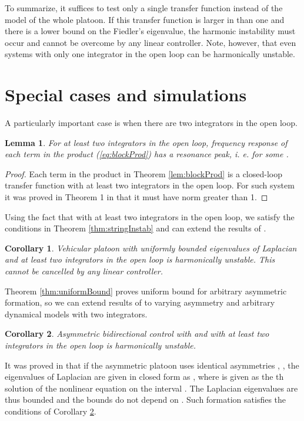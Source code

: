 \documentclass[technote, 10pt, twoside]{IEEEtran}
\theoremstyle{plain}
\newtheorem{lemma}{Lemma}
\newtheorem{corollary}{Corollary}
\theoremstyle{definition}
\theoremstyle{assump}
\begin{document}
To summarize, it suffices to test only a single transfer function
 instead of the model of the whole platoon. If this
transfer function is larger in  than one and there is a
lower bound on the Fiedler's eigenvalue, the harmonic instability must occur and
cannot be overcome by any linear controller. Note, however, that even systems
with only one integrator in the open loop can be harmonically unstable.
\section{Special cases and simulations}
A particularly important case is when there are two integrators in the open
loop.
\begin{lemma}
	For at least two integrators in the open loop, frequency response of each term 	in the product (\ref{eq:blockProd}) has a resonance peak, i. e.  for some .
	\label{lem:overshoot}
\end{lemma}
\begin{proof}
	Each term in the product in Theorem \ref{lem:blockProd} is a closed-loop
	transfer function with at least two integrators in the open loop. For such system it was proved in Theorem 1 in \cite{Seiler2004a} that it must have  norm greater than 1. 
\end{proof} 
Using the fact that  with at least two
integrators in the open loop, we satisfy the
conditions in Theorem \ref{thm:stringInstab} and can extend the results of
\cite{Seiler2004a}.
\begin{corollary}
	Vehicular platoon with uniformly bounded eigenvalues of Laplacian and at least	two integrators in the open loop is harmonically unstable. This cannot be 	cancelled by any linear controller.
\end{corollary}

Theorem \ref{thm:uniformBound} proves uniform bound for arbitrary asymmetric formation, so we can extend results of \cite{Tangerman2012} to varying asymmetry
and arbitrary dynamical models with two integrators.
\begin{corollary}
	Asymmetric bidirectional control with  and with at least two integrators in the open
	loop is harmonically unstable.
	\label{cor:asymHarmUnstable}
\end{corollary}
It was proved in \cite{Herman2013,Tangerman2012} that if the asymmetric platoon
uses identical asymmetries , , the eigenvalues of
Laplacian are given in closed form as , where  is given as the th
solution of the nonlinear equation  on the interval
.  The Laplacian eigenvalues are thus bounded and the bounds
 do not depend on . Such formation satisfies the
conditions of Corollary \ref{cor:asymHarmUnstable}.
\end{document}
